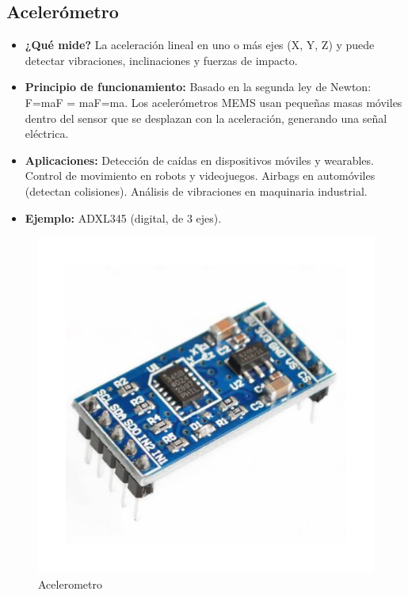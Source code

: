 \subsection*{Acelerómetro}
\begin{itemize}
	\item \textbf{¿Qué mide?} La aceleración lineal en uno o más ejes (X, Y, Z) y puede detectar vibraciones, inclinaciones y fuerzas de impacto.
	\item \textbf{Principio de funcionamiento:} Basado en la segunda ley de Newton: F=maF = maF=ma.
	Los acelerómetros MEMS usan pequeñas masas móviles dentro del sensor que se desplazan con la aceleración, generando una señal eléctrica.
	\item \textbf{Aplicaciones:} Detección de caídas en dispositivos móviles y wearables.
	Control de movimiento en robots y videojuegos.
	Airbags en automóviles (detectan colisiones).
	Análisis de vibraciones en maquinaria industrial.
	\item \textbf{Ejemplo:} ADXL345 (digital, de 3 ejes).
	\cite{universalrobots_sensores_robótica}
	\cite{robotnik_sensores_2023}
\end{itemize}
\begin{figure}[h]
	\centering
	\includegraphics[width=0.3\linewidth]{img/acelerometro}
	\caption{Acelerometro}
	\label{fig:acelerometro}
\end{figure}

